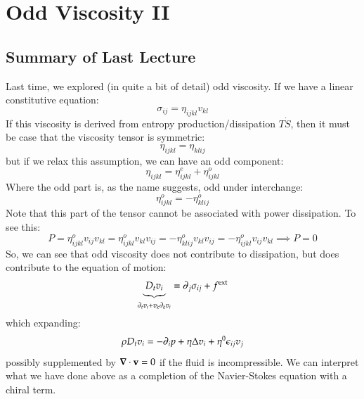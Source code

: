\section{Odd Viscosity II}

\subsection{Summary of Last Lecture}
Last time, we explored (in quite a bit of detail) odd viscosity. If we have a linear constitutive equation:
\begin{equation}
    \sigma_{ij} = \eta_{ijkl}v_{kl}
\end{equation}
If this viscosity is derived from entropy production/dissipation $T\dot{S}$, then it must be case that the viscosity tensor is symmetric:
\begin{equation}
    \eta_{ijkl} = \eta_{klij}
\end{equation}
but if we relax this assumption, we can have an odd component:
\begin{equation}
    \eta_{ijkl} = \eta^e_{ijkl} + \eta^o_{ijkl}
\end{equation}
Where the odd part is, as the name suggests, odd under interchange:
\begin{equation}
    \eta^o_{ijkl} = -\eta^o_{klij}
\end{equation}
Note that this part of the tensor cannot be associated with power dissipation. To see this:
\begin{equation}
    P = \eta^o_{ijkl}v_{ij}v_{kl} = \eta^o_{ijkl}v_{kl}v_{ij} = -\eta^o_{klij}v_{kl}v_{ij} = -\eta^o_{ijkl}v_{ij}v_{kl} \implies P = 0
\end{equation}
So, we can see that odd viscosity does not contribute to dissipation, but does contribute to the equation of motion:
\begin{equation}
    \underbrace{D_t v_i}_{\partial_t v_i + v_k \partial_k v_i} = \partial_j \sigma_{ij} + f^{\text{ext}}
\end{equation}
which expanding:
\begin{equation}\label{eq:modNavierStokes}
    \rho D_t v_i = -\partial_i p + \eta \Delta v_i + \eta^0\epsilon_{ij}v_j
\end{equation}
possibly supplemented by $\nabla \cdot \v{v} = 0$ if the fluid is incompressible. We can interpret what we have done above as a completion of the Navier-Stokes equation with a chiral term.


